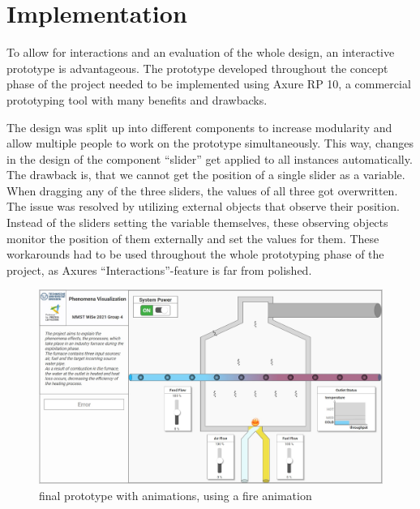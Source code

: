 \section*{Implementation}
To allow for interactions and an evaluation of the whole design, an interactive prototype is advantageous. The prototype developed throughout the concept phase of the project needed to be implemented using Axure RP 10, a commercial prototyping tool with many benefits and drawbacks.

The design was split up into different components to increase modularity and allow multiple people to work on the prototype simultaneously. This way, changes in the design of the component “slider” get applied to all instances automatically. The drawback is, that we cannot get the position of a single slider as a variable. When dragging any of the three sliders, the values of all three got overwritten. The issue was resolved by utilizing external objects that observe their position. Instead of the sliders setting the variable themselves, these observing objects monitor the position of them externally and set the values for them. These workarounds had to be used throughout the whole prototyping phase of the project, as Axures “Interactions”-feature is far from polished. 

\begin{figure}[htp]
    \centering
    \includegraphics[width=1\linewidth]{images/concept/prototype/prototype_final.jpg}
    \caption{final prototype with animations, using a fire animation \cite{davin_fireball_2021}}
\label{fig:axure_final_prototype}
\end{figure}

